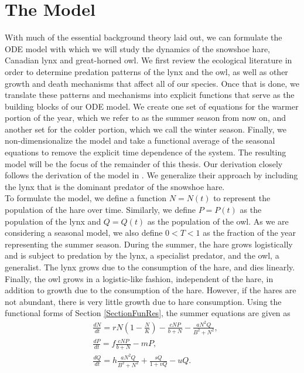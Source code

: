 \documentclass[12pt]{UOthesis}
\theoremstyle{remarkstyle}
\begin{document}
\chapter{The Model}
\label{ChapterHLOChap6}

With much of the essential background theory laid out, we can formulate the ODE model with which we will study the dynamics of the snowshoe hare, Canadian lynx and great-horned owl. We first review the ecological literature in order to determine predation patterns of the lynx and the owl, as well as other growth and death mechanisms that affect all of our species. Once that is done, we translate these patterns and mechanisms into explicit functions that serve as the building blocks of our ODE model. We create one set of equations for the warmer portion of the year, which we refer to as the summer season from now on, and another set for the colder portion, which we call the winter season. Finally, we non-dimensionalize the model and take a functional average of the seasonal equations to remove the explicit time dependence of the system. The resulting model will be the focus of the remainder of this thesis. Our derivation closely follows the derivation of the model in \cite{TysonLutscher}. We generalize their approach by including the lynx that is the dominant predator of the snowshoe hare.\\

To formulate the model, we define a function $N=N(t)$ to represent the population of the hare over time. Similarly, we define $P=P(t)$ as the population of the lynx and $Q=Q(t)$ as the population of the owl. As we are considering a seasonal model, we also define $0<T< 1$ as the fraction of the year representing the summer season. During the summer, the hare grows logistically and is subject to predation by the lynx, a specialist predator, and the owl, a generalist. The lynx grows due to the consumption of the hare, and dies linearly. Finally, the owl grows in a logistic-like fashion, independent of the hare, in addition to growth due to the consumption of the hare. However, if the hares are not abundant, there is very little growth due to hare consumption. Using the functional forms of Section \ref{SectionFunRes}, the summer equations are given as
\begin{equation}
\begin{split}
&\frac{dN}{dt}=rN\left(1-\frac{N}{K}\right)-\frac{cNP}{b+N}-\frac{aN^2Q}{B^2+N^2},\\
&\frac{dP}{dt}=f\frac{cNP}{b+N}-mP,\\
&\frac{dQ}{dt}=h\frac{aN^2Q}{B^2+N^2}+\frac{sQ}{1+vQ}-uQ.
\end{split}
\label{SumEqns}
\end{equation}
\end{document}
